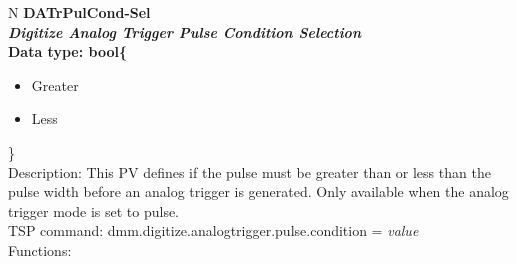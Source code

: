 \documentclass[openany]{article}
\begin{document}
		\begin{tabular}{N}
			\hline
			\bfseries DATrPulCond-Sel\label{pv:datrpulcond-sel} \\ \hline
			\emph{Digitize Analog Trigger Pulse Condition Selection} \\
			Data type: bool\{\begin{itemize}[noitemsep]
				\small
				\item[] Greater
				\item[] Less
			\end{itemize}\} \\
			Description: This PV defines if the pulse must be greater than or less than the pulse width before an analog trigger is generated. Only available when the analog trigger mode is set to pulse. \\
			TSP command: dmm.digitize.analogtrigger.pulse.condition = \emph{value} \\
			Functions: \\
			\arrayrulecolor{\FuncTableBorderColor}

		\end{tabular}
\end{document}
